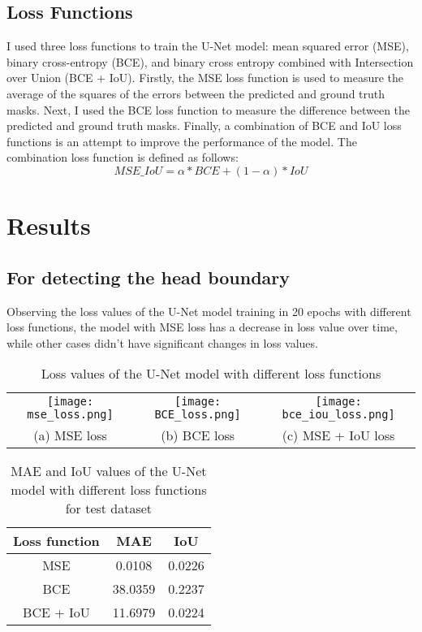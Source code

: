 \documentclass{article}
\begin{document}
\subsection{Loss Functions}
I used three loss functions to train the U-Net model: mean squared error (MSE), binary cross-entropy (BCE), 
and binary cross entropy combined with Intersection over Union (BCE + IoU). 
Firstly, the MSE loss function is used to measure the average of the squares of the errors between the predicted and ground truth masks. 
Next, I used the BCE loss function to measure the difference between the predicted and ground truth masks. 
Finally, a combination of BCE and IoU loss functions is an attempt to improve the performance of the model.
The combination loss function is defined as follows:
\begin{equation}
    MSE\_IoU = \alpha * BCE + (1 - \alpha) * IoU
\end{equation}

\section{Results}
\subsection{For detecting the head boundary}
Observing the loss values of the U-Net model training in 20 epochs with different loss functions, the model 
with MSE loss has a decrease in loss value over time, while other cases didn't have significant changes in loss values.
\begin{table}[h]
    \centering
    \begin{tabular}{ccc}
        \texttt{[image: mse\_loss.png]} & 
        \texttt{[image: BCE\_loss.png]} & 
        \texttt{[image: bce\_iou\_loss.png]} \\
        (a) MSE loss & (b) BCE loss & (c) MSE + IoU loss
    \end{tabular}
    \caption{Loss values of the U-Net model with different loss functions}
\end{table}

\begin{table}[h]
    \centering
    \begin{tabular}{|c|c|c|}
        \hline
        Loss function & MAE & IoU \\
        \hline
        MSE & 0.0108 & 0.0226 \\
        BCE & 38.0359 & 0.2237 \\
        BCE + IoU & 11.6979 & 0.0224 \\
        \hline
    \end{tabular}
    \caption{MAE and IoU values of the U-Net model with different loss functions for test dataset}
\end{table}
\end{document}
